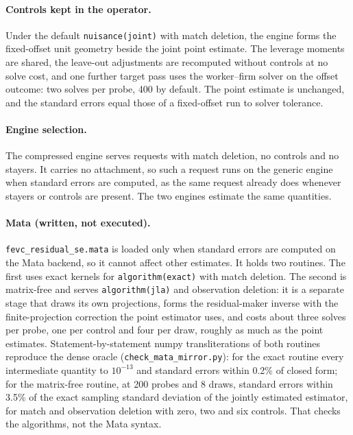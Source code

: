 \documentclass[11pt]{article}
\begin{document}
\begin{sloppypar}
\paragraph{Controls kept in the operator.} Under the default
\texttt{nuisance(joint)} with match deletion, the engine forms the
fixed-offset unit geometry beside the joint point estimate. The leverage
moments are shared, the leave-out adjustments are recomputed without controls
at no solve cost, and one further target pass uses the worker--firm solver on
the offset outcome: two solves per probe, 400 by default. The point estimate
is unchanged, and the standard errors equal those of a fixed-offset run to
solver tolerance.

\paragraph{Engine selection.} The compressed engine serves requests with
match deletion, no controls and no stayers. It carries no attachment, so such
a request runs on the generic engine when standard errors are computed, as
the same request already does whenever stayers or controls are present. The
two engines estimate the same quantities.

\paragraph{Mata (written, not executed).}
\texttt{fevc\_residual\_se.mata} is loaded only when standard errors are
computed on the Mata backend, so it cannot affect other estimates. It holds
two routines. The first uses exact kernels for \texttt{algorithm(exact)} with
match deletion. The second is matrix-free and serves \texttt{algorithm(jla)}
and observation deletion: it is a separate stage that draws its own
projections, forms the residual-maker inverse with the finite-projection
correction the point estimator uses, and costs about three solves per probe,
one per control and four per draw, roughly as much as the point estimates.
Statement-by-statement numpy transliterations of both routines reproduce the
dense oracle (\texttt{check\_mata\_mirror.py}): for the exact routine every
intermediate quantity to $10^{-13}$ and standard errors within 0.2\% of
closed form; for the matrix-free routine, at 200 probes and 8 draws, standard
errors within 3.5\% of the exact sampling standard deviation of the jointly
estimated estimator, for match and observation deletion with zero, two and
six controls. That checks the algorithms, not the Mata syntax.


\end{sloppypar}
\end{document}
